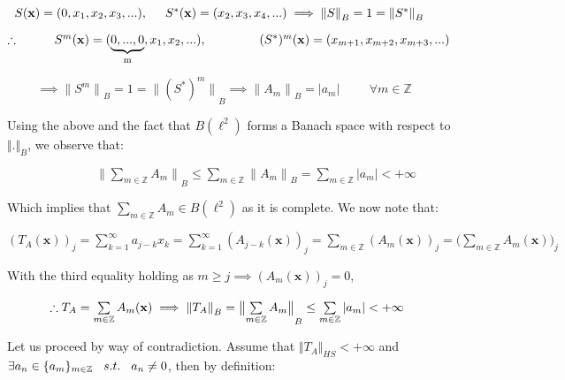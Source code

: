 \documentclass[10pt,a4paper]{article}
\begin{document}
$\hspace{0.2cm} S(\mathbf{x}) = (0,x_1,x_2,x_3,...),\hspace{0.5cm} S^*(\mathbf{x}) = (x_2,x_3,x_4,...) \implies {\lVert S \rVert}_B = 1 = {\lVert S^* \rVert}_B$

$\therefore \hspace{1cm} S^m(\mathbf{x}) = (\underbrace{{0,...,0}}_\text{m},x_1,x_2,...), \hspace{1.5cm} (S^*)^m(\mathbf{x}) = (x_{m+1},x_{m+2},x_{m+3},...)$ 

$ \hspace{1cm}\implies {\lVert S^m \rVert}_B = 1 = {\lVert (S^*)^m \rVert}_B \implies {\lVert A_m \rVert}_B = |a_m| \hspace{1cm} \forall m \in \mathbb{Z}$

Using the above and the fact that $B(\ell^2)$ forms a Banach space with respect to ${\Vert . \Vert}_B$, we observe that:

$\hspace{3cm}{\lVert \sum\limits_{m \in \mathbb{Z}}A_m \rVert}_B \le \sum\limits_{m \in \mathbb{Z}}{\lVert A_m \rVert}_B = \sum\limits_{m \in \mathbb{Z}}|a_m| < +\infty$

Which implies that $\sum\limits_{m \in \mathbb{Z}}A_m \in B(\ell^2)$ as it is complete. We now note that:

$(T_A(\mathbf{x}))_j = \sum\limits_{k=1}^\infty a_{j-k}x_k = \sum\limits_{k=1}^\infty (A_{j-k}(\mathbf{x}))_j =  \sum\limits_{m \in \mathbb{Z}} (A_m(\mathbf{x}))_j = \bigl({\sum\limits_{m \in \mathbb{Z}}A_m(\mathbf{x})}\bigr)_j$

With the third equality holding as $m \ge j \implies (A_m(\mathbf{x}))_j = 0$,

$\hspace{1.2cm}\therefore T_A = \sum\limits_{m \in \mathbb{Z}}A_m(\mathbf{x}) \implies {\lVert T_A \rVert}_B={\bigl\lVert \sum\limits_{m \in \mathbb{Z}}A_m \bigr\rVert}_B \le \sum\limits_{m \in \mathbb{Z}}|a_m| < +\infty$


Let us proceed by way of contradiction. Assume that ${\Vert T_A \Vert}_{HS} < +\infty$ and $\exists a_n \in \lbrace a_m \rbrace_{m \in \mathbb{Z}} \hspace{3mm} s.t. \hspace{3mm} a_n \neq 0$, then by definition:
\end{document}
